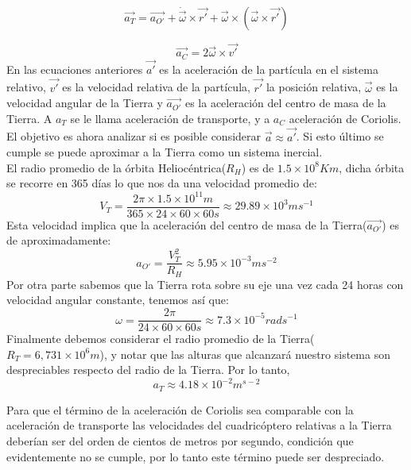 \documentclass[main]{subfiles}
\begin{document}
\begin{equation}
\vec{a_T}=\vec{a_{O\prime}}+\dot{\vec{\omega}}\times\vec{r\prime}+\vec{\omega}\times (\vec{\omega}\times\vec{r\prime})
\end{equation}

\begin{equation}
\vec{a_C}=2\vec{\omega}\times\vec{v\prime}
\end{equation}
En las ecuaciones anteriores $\vec{a\prime}$ es la aceleraci\'on de la part\'icula en el sistema relativo, $\vec{v\prime}$ es la velocidad relativa de la part\'icula, $\vec{r\prime}$ la posici\'on relativa, $\vec{\omega}$ es la velocidad angular de la Tierra y $\vec{a_{O\prime}}$ es la aceleraci\'on del centro de masa de la Tierra. A $a_T$ se le llama aceleraci\'on de transporte, y a $a_C$ aceleraci\'on de Coriolis. El objetivo es ahora analizar si es posible considerar $\vec{a}\approx\vec{a\prime}$. Si esto \'ultimo se cumple se puede aproximar a la Tierra como un sistema inercial.\\

El radio promedio de la \'orbita Helioc\'entrica($R_H$) es de $1.5\times10^8Km$, dicha \'orbita se recorre en 365 d\'ias lo que nos da una velocidad promedio de:
\begin{equation}
V_T=\frac{2\pi\times1.5\times10^{11}m}{365\times24\times60\times60s}\approx29.89\times10^3ms^{-1}
\end{equation}
Esta velocidad implica que la aceleraci\'on del centro de masa de la Tierra($\vec{a_{O\prime}}$) es de aproximadamente:
\begin{equation}
a_{O\prime}=\frac{V_T^2}{R_H}\approx5.95\times10^{-3}ms^{-2}
\end{equation}
Por otra parte sabemos que la Tierra rota sobre su eje una vez cada 24 horas con velocidad angular constante, tenemos as\'i que:
\begin{equation}
\omega=\frac{2\pi}{24\times60\times60s}\approx7.3\times10^{-5}rad s^{-1}
\end{equation}
Finalmente debemos considerar el radio promedio de la Tierra($R_T=6,731\times10^{6}m$), y notar que las alturas que alcanzar\'a nuestro sistema son despreciables respecto del radio de la Tierra. Por lo tanto,
\begin{equation}
a_T \approx 4.18\times10^{-2}m^{s-2}
\end{equation}

Para que el t\'ermino de la aceleraci\'on de Coriolis sea comparable con la aceleraci\'on de transporte las velocidades del cuadric\'optero relativas a la Tierra deber\'ian ser del orden de cientos de metros por segundo, condici\'on que evidentemente no se cumple, por lo tanto este t\'ermino puede ser despreciado.\\ 
\end{document}
